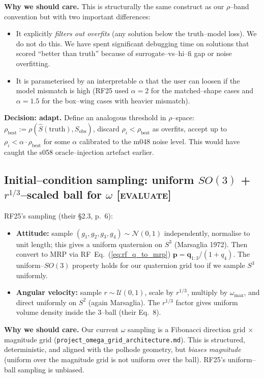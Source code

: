 \documentclass[11pt]{article}
\newcommand{\ttt}[1]{\texttt{#1}}
\newcommand{\rf}[1]{RF~Eq.~(\ref{#1})}  %
\begin{document}
\textbf{Why we should care.} This is structurally the same construct as our
$\rho$--band convention but with two important differences:
\begin{itemize}
\item It explicitly \emph{filters out overfits} (any solution below the
truth--model loss). We do not do this. We have spent significant
debugging time on solutions that scored ``better than truth'' because of
surrogate--vs--hi--fi gap or noise overfitting.
\item It is parameterised by an interpretable $\alpha$ that the user can
loosen if the model mismatch is high (RF25 used $\alpha = 2$ for the
matched--shape cases and $\alpha = 1.5$ for the box--wing cases with
heavier mismatch).
\end{itemize}

\textbf{Decision: adapt.} Define an analogous threshold in $\rho$--space:
$\rho_{\mathrm{best}} := \rho(\hat{S}(\text{truth}), S_{\mathrm{obs}})$,
discard $\rho_i < \rho_{\mathrm{best}}$ as overfits, accept up to
$\rho_i < \alpha \cdot \rho_{\mathrm{best}}$ for some $\alpha$ calibrated to
the m048 noise level. This would have caught the s058 oracle--injection
artefact earlier.

\subsection{Initial--condition sampling: uniform $SO(3)$ + $r^{1/3}$--scaled ball for $\omega$ \textnormal{[\textsc{evaluate}]}}

\noindent
RF25's sampling (their \S2.3, p.~6):
\begin{itemize}
\item \textbf{Attitude:} sample $(g_1, g_2, g_3, g_4) \sim \mathcal{N}(0,1)$
independently, normalise to unit length; this gives a uniform quaternion
on $S^3$ (Marsaglia 1972). Then convert to MRP via \rf{eq:rf_q_to_mrp}
$\mathbf{p} = \mathbf{q}_{1:3} / (1 + q_4)$. The uniform--$SO(3)$ property
holds for our quaternion grid too if we sample $S^3$ uniformly.
\item \textbf{Angular velocity:} sample $r \sim \mathcal{U}(0,1)$,
scale by $r^{1/3}$, multiply by $\omega_{\max}$, and direct uniformly on
$S^2$ (again Marsaglia). The $r^{1/3}$ factor gives uniform volume
density inside the 3--ball (their Eq.~8).
\end{itemize}

\textbf{Why we should care.} Our current $\omega$ sampling is a Fibonacci
direction grid $\times$ magnitude grid (\ttt{project\_omega\_grid\_architecture.md}).
This is structured, deterministic, and aligned with the polhode geometry, but
\emph{biases magnitude} (uniform over the magnitude grid is not uniform over
the ball). RF25's uniform--ball sampling is unbiased.
\end{document}
